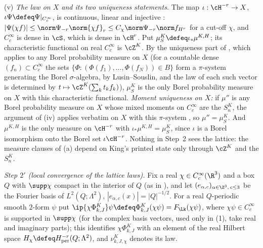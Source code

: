 (v) \emph{The law on $X$ and its two uniqueness statements.} The map $\iota:\cH^{-r}\to X$, $\iota\Psi\defeq\Psi|_{C^\infty_c}$, is continuous, linear and injective \cite[lem:D:hermite(b)]{SymPhase}: $|\Psi(\chi f)|\le\norm\Psi_{-r}\norm{\chi f}_r\le C_\chi\norm\Psi_{-r}\norm f_{H^r}$ for a cut-off $\chi$, and $C^\infty_c$ is dense in $\cS$, which is dense in $\cH^r$. Put $\mu^K_S\defeq\iota_*\mu^{K,H}$; its characteristic functional on real $C^\infty_c$ is $\cZ^K$. By the uniqueness part of \cite[lem:D:realize]{SymPhase}, which applies to any Borel probability measure on $X$ (for a countable dense $(f_n)\subset C^\infty_c$ the sets $\{\Phi:(\Phi(f_1),\dots,\Phi(f_N))\in B\}$ form a $\pi$-system generating the Borel $\sigma$-algebra, by Lusin--Souslin, and the law of each such vector is determined by $t\mapsto\cZ^K(\sum_kt_kf_k)$), $\mu^K_S$ is the only Borel probability measure on $X$ with this characteristic functional. \emph{Moment uniqueness on $X$:} if $\mu''$ is any Borel probability measure on $X$ whose mixed moments on $C^\infty_c$ are the $S^K_n$, the argument of (iv) applies verbatim on $X$ with this $\pi$-system \cite[prop:discharge]{SymPhase}, so $\mu''=\mu^K_S$. And $\mu^{K,H}$ is the only measure on $\cH^{-r}$ with $\iota_*\mu^{K,H}=\mu^K_S$, since $\iota$ is a Borel isomorphism onto the Borel set $\iota\cH^{-r}$. Nothing in Step~2 sees the lattice: the measure clauses of (a) depend on King's printed state only through $\cZ^K$ and the $S^K_n$.

\emph{Step $2'$ (local convergence of the lattice laws).} Fix a real $\chi\in C^\infty_c(\R^3)$ and a box $Q$ with $\supp\chi$ compact in the interior of $Q$ (as in \cite[prop:C-tight]{SymPhase}), and let $(e_{\alpha,c})_{\alpha\in\Z^3,\,c\le3}$ be the Fourier basis of $L^2(Q;\Lambda^2)$, $|e_{\alpha,c}(x)|=|Q|^{-1/2}$. For a real $Q$-periodic smooth $2$-form $\psi$ put $\ip{\chi\Phi^K_{k,J}}\psi\defeq\Phi^K_{k,J}(\chi\psi)=F_{\Lk}(\chi\psi)$, where $\chi\psi\in C^\infty_c$ is supported in $\supp\chi$ (for the complex basis vectors, used only in (1), take real and imaginary parts); this identifies $\chi\Phi^K_{k,J}$ with an element of the real Hilbert space $H_\chi\defeq H^{-r}_{\mathrm{per}}(Q;\Lambda^2)$, and $\nu^K_{k,J,\chi}$ denotes its law.

